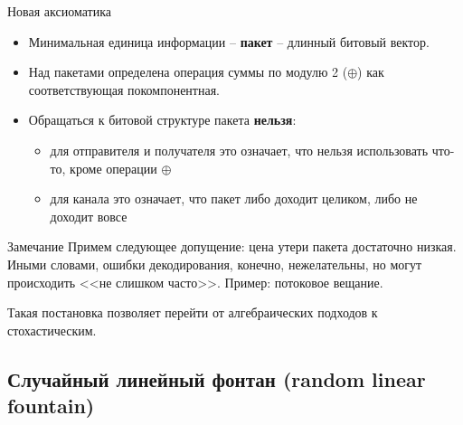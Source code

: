 \documentclass{beamer}
\begin{document}
\begin{frame}{Новая аксиоматика}

    \begin{itemize}

        \item Минимальная единица информации -- \textbf{пакет} --
        длинный битовый вектор.

        \item Над пакетами определена операция суммы по модулю 2 ($\oplus$) как
        соответствующая покомпонентная.

        \item Обращаться к битовой структуре пакета \textbf{нельзя}:

            \begin{itemize}
                \item для отправителя и получателя это означает, что
                нельзя использовать что-то, кроме операции $\oplus$
                \item для канала это означает, что пакет либо
                доходит целиком, либо не доходит вовсе
            \end{itemize}        

    \end{itemize}

    \begin{block}{Замечание}
        Примем следующее допущение: цена утери пакета
        достаточно низкая. Иными словами, ошибки декодирования, конечно,
        нежелательны, но могут происходить <<не слишком часто>>.
        Пример: потоковое вещание.
    \end{block}

    Такая постановка позволяет перейти от алгебраических подходов 
    к стохастическим.

\end{frame}

\subsection{Случайный линейный фонтан (random linear fountain)}
\end{document}
